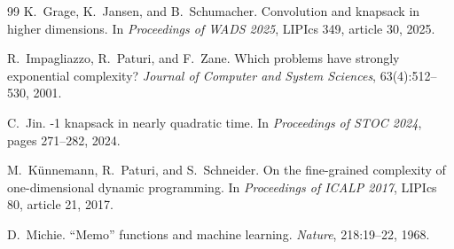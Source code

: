 \documentclass[10pt,twocolumn]{article}
\begin{document}
\begin{thebibliography}{99}
K.~Grage, K.~Jansen, and B.~Schumacher.
\newblock Convolution and knapsack in higher dimensions.
\newblock In \emph{Proceedings of WADS 2025}, LIPIcs 349, article 30, 2025.

R.~Impagliazzo, R.~Paturi, and F.~Zane.
\newblock Which problems have strongly exponential complexity?
\newblock \emph{Journal of Computer and System Sciences}, 63(4):512--530, 2001.

C.~Jin.
-1 knapsack in nearly quadratic time.
\newblock In \emph{Proceedings of STOC 2024}, pages 271--282, 2024.

M.~K\"unnemann, R.~Paturi, and S.~Schneider.
\newblock On the fine-grained complexity of one-dimensional dynamic programming.
\newblock In \emph{Proceedings of ICALP 2017}, LIPIcs 80, article 21, 2017.

D.~Michie.
\newblock ``Memo'' functions and machine learning.
\newblock \emph{Nature}, 218:19--22, 1968.

\end{thebibliography}
\end{document}
